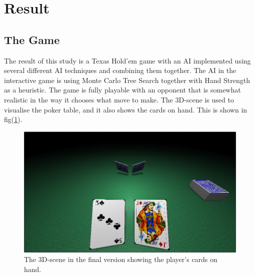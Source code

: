 \documentclass[journal]{vgtc}                %
\begin{document}
\section{Result}
\subsection{The Game}
The result of this study is a Texas Hold'em game with an AI implemented using several different AI techniques and combining them together. The AI in the interactive game is using Monte Carlo Tree Search together with Hand Strength as a heuristic. The game is fully playable with an opponent that is somewhat realistic in the way it chooses what move to make. The 3D-scene is used to visualise the poker table, and it also shows the cards on hand. This is shown in fig(\ref{fig:3dscene}).
\begin{figure}[here]
  \begin{center}
    \includegraphics[scale=0.27]{img/3dscene.png}
    \caption{\label{fig:3dscene} The 3D-scene in the final version showing the player's cards on hand.}
  \end{center}
\end{figure}
\end{document}
